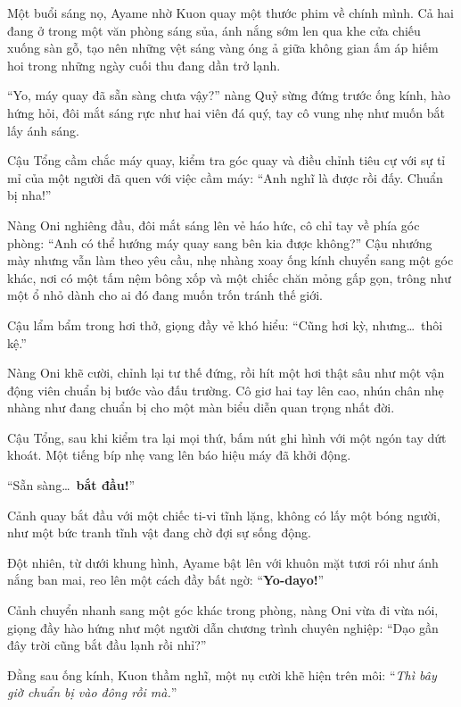 \documentclass[../main.tex]{subfiles}
\begin{document}
Một buổi sáng nọ, Ayame nhờ Kuon quay một thước phim về chính mình. Cả hai đang ở trong một văn phòng sáng sủa, ánh nắng sớm len qua khe cửa chiếu xuống sàn gỗ, tạo nên những vệt sáng vàng óng ả giữa không gian ấm áp hiếm hoi trong những ngày cuối thu đang dần trở lạnh.

``Yo, máy quay đã sẵn sàng chưa vậy?'' nàng Quỷ sừng đứng trước ống kính, hào hứng hỏi, đôi mắt sáng rực như hai viên đá quý, tay cô vung nhẹ như muốn bắt lấy ánh sáng.

Cậu Tổng cầm chắc máy quay, kiểm tra góc quay và điều chỉnh tiêu cự với sự tỉ mỉ của một người đã quen với việc cầm máy: ``Anh nghĩ là được rồi đấy. Chuẩn bị nha!''

Nàng Oni nghiêng đầu, đôi mắt sáng lên vẻ háo hức, cô chỉ tay về phía góc phòng: ``Anh có thể hướng máy quay sang bên kia được không?'' Cậu nhướng mày nhưng vẫn làm theo yêu cầu, nhẹ nhàng xoay ống kính chuyển sang một góc khác, nơi có một tấm nệm bông xốp và một chiếc chăn mỏng gấp gọn, trông như một ổ nhỏ dành cho ai đó đang muốn trốn tránh thế giới.

Cậu lẩm bẩm trong hơi thở, giọng đầy vẻ khó hiểu: ``Cũng hơi kỳ, nhưng\dots\ thôi kệ.''

Nàng Oni khẽ cười, chỉnh lại tư thế đứng, rồi hít một hơi thật sâu như một vận động viên chuẩn bị bước vào đấu trường. Cô giơ hai tay lên cao, nhún chân nhẹ nhàng như đang chuẩn bị cho một màn biểu diễn quan trọng nhất đời.

Cậu Tổng, sau khi kiểm tra lại mọi thứ, bấm nút ghi hình với một ngón tay dứt khoát. Một tiếng bíp nhẹ vang lên báo hiệu máy đã khởi động.

``Sẵn sàng\dots\ \textbf{bắt đầu!}''

\il

Cảnh quay bắt đầu với một chiếc ti-vi tĩnh lặng, không có lấy một bóng người, như một bức tranh tĩnh vật đang chờ đợi sự sống động.

Đột nhiên, từ dưới khung hình, Ayame bật lên với khuôn mặt tươi rói như ánh nắng ban mai, reo lên một cách đầy bất ngờ: ``\textbf{Yo-dayo!}''


Cảnh chuyển nhanh sang một góc khác trong phòng, nàng Oni vừa đi vừa nói, giọng đầy hào hứng như một người dẫn chương trình chuyên nghiệp: ``Dạo gần đây trời cũng bắt đầu lạnh rồi nhỉ?''

Đằng sau ống kính, Kuon thầm nghĩ, một nụ cười khẽ hiện trên môi: ``\textit{Thì bây giờ chuẩn bị vào đông rồi mà.}''
\end{document}
